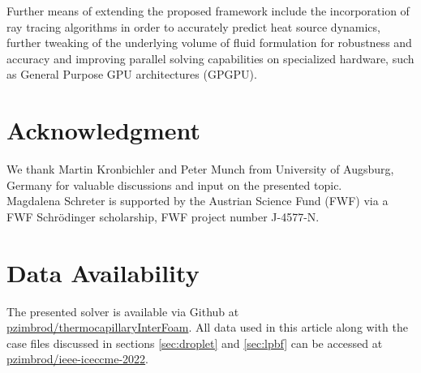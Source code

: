 \documentclass[conference,final,a4paper]{IEEEtran}
\begin{document}
Further means of extending the proposed framework include the incorporation of ray tracing algorithms in order to accurately predict heat source dynamics, further tweaking of the underlying volume of fluid formulation for robustness and accuracy and improving parallel solving capabilities on specialized hardware, such as General Purpose GPU architectures (GPGPU).

\section*{Acknowledgment}

We thank Martin Kronbichler and Peter Munch from University of Augsburg, Germany for valuable discussions and input on the presented topic.\\
Magdalena Schreter is supported by the Austrian Science Fund (FWF) via a FWF Schrödinger scholarship, FWF project number J-4577-N.

\section*{Data Availability}\label{sec:data}

The presented solver is available via Github at \href{https://github.com/pzimbrod/thermocapillaryInterFoam}{pzimbrod/thermocapillaryInterFoam}. All data used in this article along with the case files discussed in sections \ref{sec:droplet} and \ref{sec:lpbf} can be accessed at \href{https://github.com/pzimbrod/ieee-iceccme-2022}{pzimbrod/ieee-iceccme-2022}.



\end{document}
